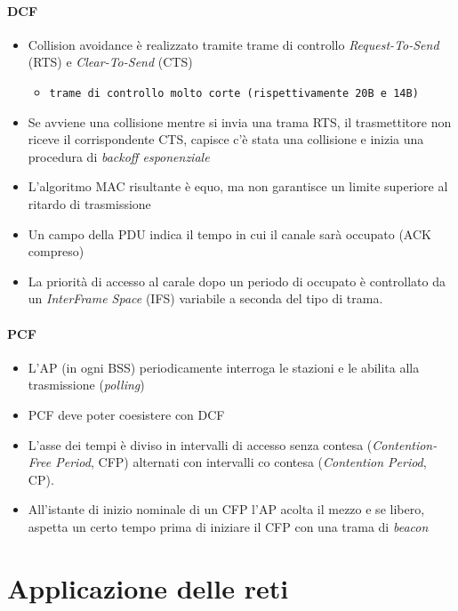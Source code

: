 \documentclass{book}
\begin{document}
\subsubsection{DCF}
\begin{itemize}
\item Collision avoidance è realizzato tramite trame di controllo \textit{Request-To-Send} (RTS) e \textit{Clear-To-Send} (CTS)
  \begin{itemize}
	\item {\tt trame di controllo molto corte (rispettivamente 20B e 14B)}
  \end{itemize}
\item Se avviene una collisione mentre si invia una trama RTS, il trasmettitore non riceve il corrispondente CTS, capisce c'è stata una collisione e inizia una procedura di {\em backoff esponenziale}
\item L'algoritmo MAC risultante è equo, ma non garantisce un limite superiore al ritardo di trasmissione
\item Un campo della PDU indica il tempo in cui il canale sarà occupato (ACK compreso)
  \item La priorità di accesso al carale dopo un periodo di occupato è controllato da un \textit{InterFrame Space} (IFS) variabile a seconda del tipo di trama.
\end{itemize}

\subsubsection{PCF}
\begin{itemize}
\item L'AP (in ogni BSS) periodicamente interroga le stazioni e le abilita alla trasmissione ({\it polling})
\item PCF deve poter coesistere con DCF
\item L'asse dei tempi è diviso in intervalli di accesso senza contesa ({\it Contention-Free Period}, CFP) alternati con intervalli co contesa ({\it Contention Period}, CP).
\item All'istante di inizio nominale di un CFP l'AP acolta il mezzo e se libero, aspetta un certo tempo prima di iniziare il CFP con una trama di {\it beacon}
\end{itemize}

\chapter{Applicazione delle reti}
\printindex
\end{document}
